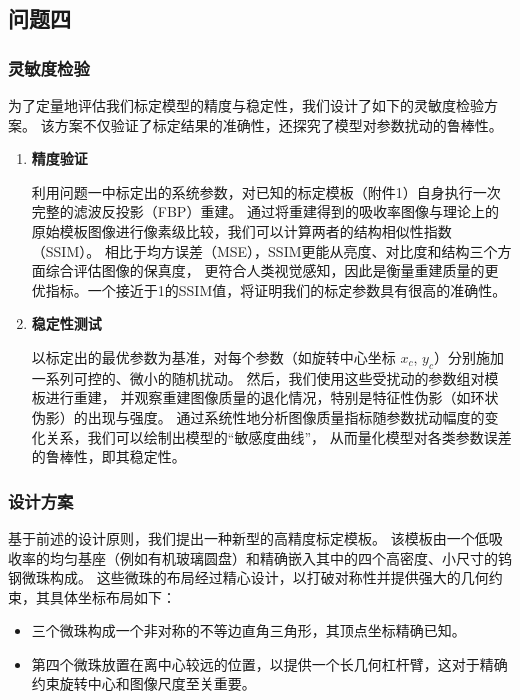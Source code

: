 \subsection{问题四}
\subsubsection{灵敏度检验}
为了定量地评估我们标定模型的精度与稳定性，我们设计了如下的灵敏度检验方案。
该方案不仅验证了标定结果的准确性，还探究了模型对参数扰动的鲁棒性。

\begin{enumerate}[label=(\arabic*), left=0.5em]
    \item \textbf{精度验证} \par
    利用问题一中标定出的系统参数，对已知的标定模板（附件1）自身执行一次完整的滤波反投影（FBP）重建。
    通过将重建得到的吸收率图像与理论上的原始模板图像进行像素级比较，我们可以计算两者的结构相似性指数（SSIM）。
    相比于均方误差（MSE），SSIM更能从亮度、对比度和结构三个方面综合评估图像的保真度，
    更符合人类视觉感知，因此是衡量重建质量的更优指标。一个接近于1的SSIM值，将证明我们的标定参数具有很高的准确性。
    \item \textbf{稳定性测试} \par
    以标定出的最优参数为基准，对每个参数（如旋转中心坐标 $x_c$, $y_c$）分别施加一系列可控的、微小的随机扰动。
    然后，我们使用这些受扰动的参数组对模板进行重建，
    并观察重建图像质量的退化情况，特别是特征性伪影（如环状伪影）的出现与强度。
    通过系统性地分析图像质量指标随参数扰动幅度的变化关系，我们可以绘制出模型的“敏感度曲线”，
    从而量化模型对各类参数误差的鲁棒性，即其稳定性。
\end{enumerate}

\subsubsection{设计方案}  
基于前述的设计原则，我们提出一种新型的高精度标定模板。
该模板由一个低吸收率的均匀基座（例如有机玻璃圆盘）和精确嵌入其中的四个高密度、小尺寸的钨钢微珠构成。
这些微珠的布局经过精心设计，以打破对称性并提供强大的几何约束，其具体坐标布局如下：\par
\begin{itemize}
    \item 三个微珠构成一个非对称的不等边直角三角形，其顶点坐标精确已知。
    \item 第四个微珠放置在离中心较远的位置，以提供一个长几何杠杆臂，这对于精确约束旋转中心和图像尺度至关重要。
\end{itemize}


